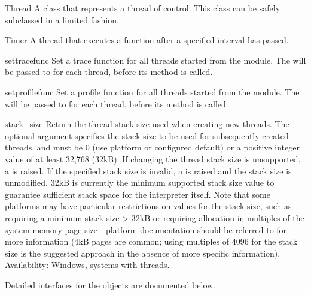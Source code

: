 \begin{classdesc*}{Thread}{}
A class that represents a thread of control.  This class can be safely
subclassed in a limited fashion.
\end{classdesc*}

\begin{classdesc*}{Timer}{}
A thread that executes a function after a specified interval has passed.
\end{classdesc*}

\begin{funcdesc}{settrace}{func}
Set a trace function for all threads started
from the  module.  The  will be passed to 
 for each thread, before its 
method is called.
\end{funcdesc}

\begin{funcdesc}{setprofile}{func}
Set a profile function for all threads started
from the  module.  The  will be passed to 
 for each thread, before its 
method is called.
\end{funcdesc}

\begin{funcdesc}{stack_size}{}
Return the thread stack size used when creating new threads.  The
optional  argument specifies the stack size to be used for
subsequently created threads, and must be 0 (use platform or
configured default) or a positive integer value of at least 32,768 (32kB).
If changing the thread stack size is unsupported, a 
is raised.  If the specified stack size is invalid, a 
is raised and the stack size is unmodified.  32kB is currently the minimum
supported stack size value to guarantee sufficient stack space for the
interpreter itself.  Note that some platforms may have particular
restrictions on values for the stack size, such as requiring a minimum
stack size > 32kB or requiring allocation in multiples of the system
memory page size - platform documentation should be referred to for
more information (4kB pages are common; using multiples of 4096 for
the stack size is the suggested approach in the absence of more
specific information).
Availability: Windows, systems with \POSIX{} threads.
\end{funcdesc}

Detailed interfaces for the objects are documented below.  

